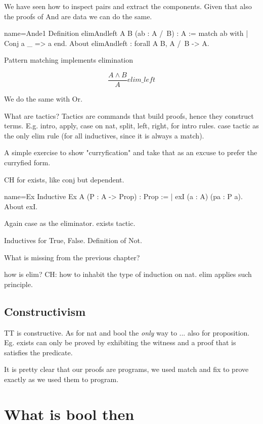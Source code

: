 We have seen how to inspect pairs and extract the components. Given that
also the proofs of And are data we can do the same.

\begin{coq}{name=Ande1}{}
Definition elimAndleft A B (ab : A /\ B) : A :=
match ab with
| Conj a _ => a
end.
About elimAndleft : forall A B, A /\ B -> A.
\end{coq}

Pattern matching implements elimination

$$
\frac{A \wedge B}{A}elim\_left
$$

We do the same with Or.

What are tactics?  Tactics are commands that build proofs, hence
they construct terms.  E.g. intro, apply, case on nat, split, left, right, for
intro rules.  case tactic as the only elim rule (for all inductives, since it
is always a match).

A simple exercise to show "curryfication" and take that as an excuse
to prefer the curryfied form.

CH for exists, like conj but dependent.

\begin{coq}{name=Ex}{}
Inductive Ex A (P : A -> Prop) : Prop :=
| exI (a : A) (pa : P a).
About exI.
\end{coq}

Again case as the eliminator.  exists tactic.

Inductives for True, False. Definition of Not.

What is missing from the previous chapter?

how is elim?
CH: how to inhabit the type of induction on nat.
elim applies such principle.

\subsection{Constructivism}

TT is constructive.  As for nat and bool the \emph{only} way
to ... also for proposition. Eg. exists can only be proved
by exhibiting the witness and a proof that is satisfies the predicate.

It is pretty clear that our proofs are programs, we used match and fix
to prove exactly as we used them to program.

\section{What is bool then}

